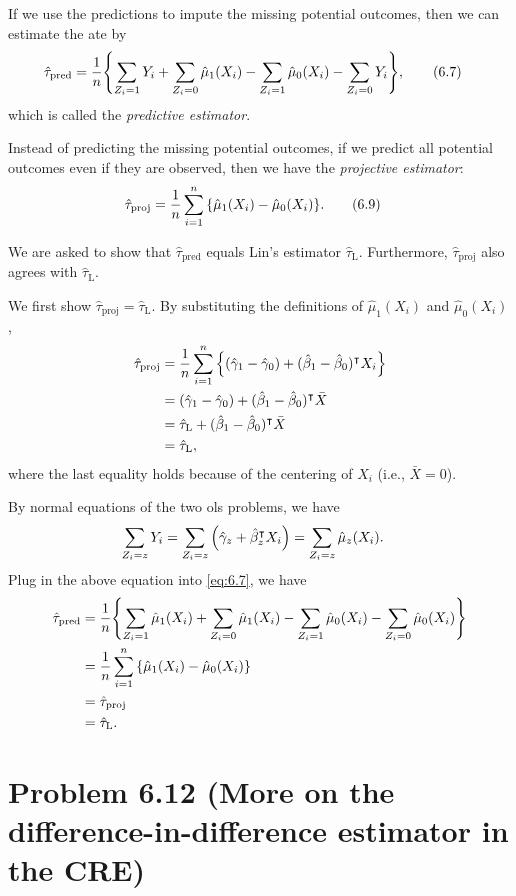 \documentclass[10pt]{article}
\begin{document}
If we use the predictions to impute the missing potential outcomes,
then we can estimate the \gls{ate} by
\begin{align*}
  \hat{\tau}_{\text{pred}}
  &= \frac{1}{n} 
  {\left\lbrace \sum_{Z_i = 1} Y_i + \sum_{Z_i = 0} \hat{\mu}_1(X_i)
  - \sum_{Z_i = 1} \hat{\mu}_0(X_i) - \sum_{Z_i = 0} Y_i \right\rbrace}, \tag{6.7}
  \label{eq:6.7}
\end{align*}
which is called the \emph{predictive estimator}.

Instead of predicting the missing potential outcomes,
if we predict all potential outcomes even if they are observed,
then we have the \emph{projective estimator}:
\begin{align*}
  \hat{\tau}_{\text{proj}}
  &= \frac{1}{n} \sum_{i=1}^n {\left\lbrace \hat{\mu}_1(X_i) - \hat{\mu}_0(X_i) \right\rbrace}. \tag{6.9}
\end{align*}

We are asked to show that 
$\hat{\tau}_{\text{pred}}$ equals Lin's estimator $\hat{\tau}_{\text{L}}$.
Furthermore, $\hat{\tau}_{\text{proj}}$ also agrees with $\hat{\tau}_{\text{L}}$.

We first show $\hat{\tau}_{\text{proj}} = \hat{\tau}_{\text{L}}$.
By substituting the definitions of $\hat{\mu}_1(X_i)$ and $\hat{\mu}_0(X_i)$,
\begin{align*}
  \hat{\tau}_{\text{proj}}
  &= \frac{1}{n} \sum_{i=1}^n {\left\lbrace (\hat{\gamma}_1 - \hat{\gamma}_0) + (\hat{\beta}_1 - \hat{\beta}_0)^\intercal X_i \right\rbrace} \\
  &= (\hat{\gamma}_1 - \hat{\gamma}_0) + (\hat{\beta}_1 - \hat{\beta}_0)^\intercal \bar{X} \\
  &= \hat{\tau}_{\text{L}} + (\hat{\beta}_1 - \hat{\beta}_0)^\intercal \bar{X} \\
  &= \hat{\tau}_{\text{L}},
\end{align*}
where the last equality holds because of the centering of $X_i$ (i.e., $\bar{X} = 0$).

By normal equations of the two \gls{ols} problems,
we have
\begin{align*}
  \sum_{Z_i = z} Y_i 
  &= \sum_{Z_i = z} {\left( \hat{\gamma}_z + \hat{\beta}_z^\intercal X_i \right)}
  = \sum_{Z_i = z} \hat{\mu}_z(X_i).
\end{align*}
Plug in the above equation into \cref{eq:6.7}, we have
\begin{align*}
  \hat{\tau}_{\text{pred}}
  &= \frac{1}{n} 
  {\left\lbrace \sum_{Z_i = 1} \hat{\mu}_1(X_i) + \sum_{Z_i = 0} \hat{\mu}_1(X_i)
  - \sum_{Z_i = 1} \hat{\mu}_0(X_i) - \sum_{Z_i = 0} \hat{\mu}_0(X_i) \right\rbrace} \\
  &= \frac{1}{n} \sum_{i=1}^n {\left\lbrace \hat{\mu}_1(X_i) - \hat{\mu}_0(X_i) \right\rbrace} \\
  &= \hat{\tau}_{\text{proj}} \\
  &= \hat{\tau}_{\text{L}}.
\end{align*}

\section*{Problem 6.12 (More on the difference-in-difference estimator in the CRE)}

\printglossaries
\end{document}
